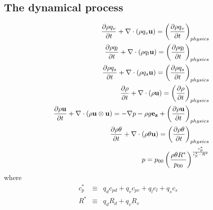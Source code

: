 \subsection{The dynamical process}
\begin{eqnarray}
&&  \frac{\partial \rho q_v}{\partial t}
+ \nabla \cdot\left(\rho q_v {\bf u}\right) = \left(\frac{\partial \rho q_v}{\partial t}\right)_{physics}
\label{eq:rho_v_d2}\\
&&  \frac{\partial \rho q_l}{\partial t}
+ \nabla \cdot\left(\rho q_l {\bf u}\right) = \left(\frac{\partial \rho q_l}{\partial t}\right)_{physics}
\label{eq:rho_l_d2}\\
&&  \frac{\partial \rho q_s}{\partial t}
+ \nabla \cdot\left(\rho q_s {\bf u}\right)
= \left(\frac{\partial \rho q_s}{\partial t}\right)_{physics}
\label{eq:rho_s_d2}\\
&&  \frac{\partial \rho}{\partial t}
+ \nabla\cdot\left(\rho{\bf u}\right)
= \left(\frac{\partial \rho}{\partial t}\right)_{physics}
 \label{eq:rhotot_d2}\\
&&  \frac{\partial \rho {\bf u}}{\partial t}
+ \nabla \cdot \left(\rho{\bf u} \otimes {\bf u}\right)
=
-\nabla p - \rho g {\bf e_z}
+\left(\frac{\partial \rho {\bf u}}{\partial t}\right)_{physics}
 \label{eq:momtot_d2}\\
&&  \frac{\partial \rho \theta  }{\partial t}
+  \nabla \cdot \left( \rho \theta {\bf u} \right) =
\left(\frac{\partial \rho \theta}{\partial t}\right)_{physics} \\
&& p=p_{00}\left(\frac{\rho \theta R^*}{p_{00}} \right)^{\frac{c_{p}^*}{c_{p}^*- R^*}}
\end{eqnarray}
where
\begin{eqnarray}
  c_p^* &\equiv& q_d c_{pd} +q_vc_{pv}+q_lc_l+q_sc_s\\
  R^* &\equiv& q_d R_d + q_v R_v
\end{eqnarray}

